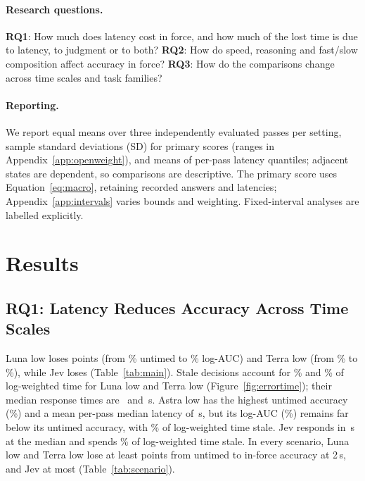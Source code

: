 \documentclass[11pt]{article}
\begin{document}
\paragraph{Research questions.}
\textbf{RQ1}: How much does latency cost in force, and how much of the lost time is due to latency, to judgment or to both?
\textbf{RQ2}: How do speed, reasoning and fast/slow composition affect accuracy in force?
\textbf{RQ3}: How do the comparisons change across time scales and task families?

\paragraph{Reporting.}
We report equal means over three independently evaluated passes per setting, sample standard deviations (SD) for primary scores (ranges in Appendix~\ref{app:openweight}), and means of per-pass latency quantiles; adjacent states are dependent, so comparisons are descriptive. The primary score uses Equation~\eqref{eq:macro}, retaining recorded answers and latencies; Appendix~\ref{app:intervals} varies bounds and weighting. Fixed-interval analyses are labelled explicitly.


\section{Results}
\label{sec:results}

\subsection{RQ1: Latency Reduces Accuracy Across Time Scales}
\label{sec:rq1}
Luna low loses \LunaAucGap{} points (from \LunaUntimed\% untimed to \LunaAuc\% log-AUC) and Terra low \TerraAucGap{} (from \TerraUntimed\% to \TerraAuc\%), while Jev loses \JevAucGap{} (Table~\ref{tab:main}).
Stale decisions account for \LunaAucStale\% and \TerraAucStale\% of log-weighted time for Luna low and Terra low (Figure~\ref{fig:errortime}); their median response times are \LunaLatencyMedian\ and \TerraLatencyMedian\,s.
Astra low has the highest untimed accuracy (\AstraUntimed\%) and a mean per-pass median latency of \AstraLatencyMedian\,s, but its log-AUC (\AstraAuc\%) remains far below its untimed accuracy, with \AstraAucStale\% of log-weighted time stale.
Jev responds in \JevLatencyMedian\,s at the median and spends \JevAucStale\% of log-weighted time stale. In every scenario, Luna low and Terra low lose at least \GPTMinScenarioGap{} points from untimed to in-force accuracy at 2\,s, and Jev at most \JevMaxScenarioGap{} (Table~\ref{tab:scenario}).
\end{document}
